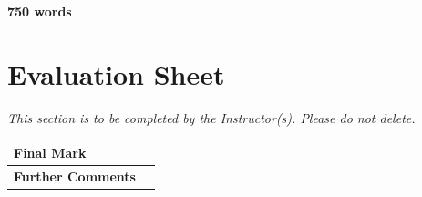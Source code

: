 \documentclass[11pt,a4paper]{article}
\begin{document}
\textbf{750 words}

\clearpage
\section*{Evaluation Sheet}

\textit{This section is to be completed by the Instructor(s). Please do not delete.}

\vspace{1em}
\renewcommand{\arraystretch}{1.8}
\begin{tabularx}{\textwidth}{>{\bfseries}p{3.5cm}X}
\toprule
Final Mark & \\
\midrule
Further Comments & \rule{0pt}{9cm} \\
\bottomrule
\end{tabularx}
\end{document}
